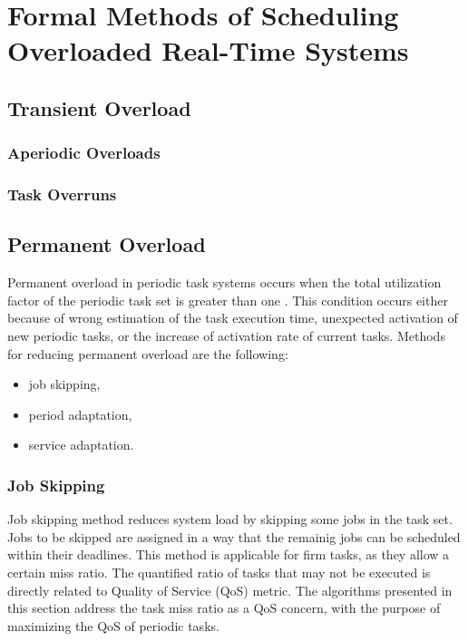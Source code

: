 \chapter{Formal Methods of Scheduling Overloaded Real-Time Systems}

\section{Transient Overload}
\subsection{Aperiodic Overloads}
\subsection{Task Overruns}

\section{Permanent Overload}

Permanent overload in periodic task systems occurs when the total utilization factor of the periodic task set is greater than one \cite{buttazzo2011hard}. 
This condition occurs either because of wrong estimation of the task execution time, unexpected activation of new periodic tasks, or the increase of activation rate of current tasks.
Methods for reducing permanent overload are the following:
\begin{itemize}
	\item{job skipping,}
	\item{period adaptation,}
	\item{service adaptation.}
\end{itemize}

\subsection{Job Skipping}
Job skipping method reduces system load by skipping some jobs in the task set. Jobs to be skipped are assigned in a way that the remainig jobs can be scheduled within their deadlines.
This method is applicable for firm tasks, as they allow a certain miss ratio. 
The quantified ratio of tasks that may not be executed is directly related to Quality of Service 
(QoS) metric. 
The algorithms presented in this section address the task miss ratio as a QoS concern, with the purpose of maximizing the QoS of periodic tasks.

